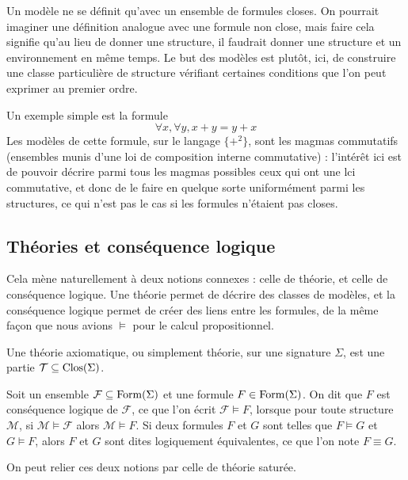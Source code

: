 Un modèle ne se définit qu'avec un ensemble de formules closes. On pourrait
imaginer une définition analogue avec une formule non close, mais faire cela
signifie qu'au lieu de donner une structure, il faudrait donner une structure et
un environnement en même temps. Le but des modèles est plutôt, ici, de construire
une classe particulière de structure vérifiant certaines conditions que l'on peut
exprimer au premier ordre.

Un exemple simple est la formule
\[\forall x,\forall y, x + y = y + x\]
Les modèles de cette formule, sur le langage $\{+^2\}$, sont les magmas
commutatifs (ensembles munis d'une loi de composition interne commutative) :
l'intérêt ici est de pouvoir décrire parmi tous les magmas possibles ceux qui
ont une lci commutative, et donc de le faire en quelque sorte uniformément parmi
les structures, ce qui n'est pas le cas si les formules n'étaient pas closes.

\subsection{Théories et conséquence logique}

Cela mène naturellement à deux notions connexes : celle de théorie, et celle
de conséquence logique. Une théorie permet de décrire des classes de modèles, et
la conséquence logique permet de créer des liens entre les formules, de la même
façon que nous avions $\vDash$ pour le calcul propositionnel.

\begin{definition}[Théorie]
  Une théorie axiomatique, ou simplement théorie, sur une signature $\Sigma$, est
  une partie $\mathcal T\subseteq\operatorname{Clos}(\Sigma)$.
\end{definition}

\begin{definition}
  Soit un ensemble $\mathcal F \subseteq \operatorname{Form}(\Sigma)$ et une formule
  $F\in\operatorname{Form}(\Sigma)$. On dit que $F$ est conséquence logique de $\mathcal F$,
  ce que l'on écrit $\mathcal F \vDash F$, lorsque pour toute structure
  $\mathcal M$, si $\mathcal M\models \mathcal F$ alors $\mathcal M\models F$.
  Si deux formules $F$ et $G$ sont telles que $F\vDash G$ et $G\vDash F$, alors
  $F$ et $G$ sont dites logiquement équivalentes, ce que l'on note $F\equiv G$.
\end{definition}

On peut relier ces deux notions par celle de théorie saturée.

